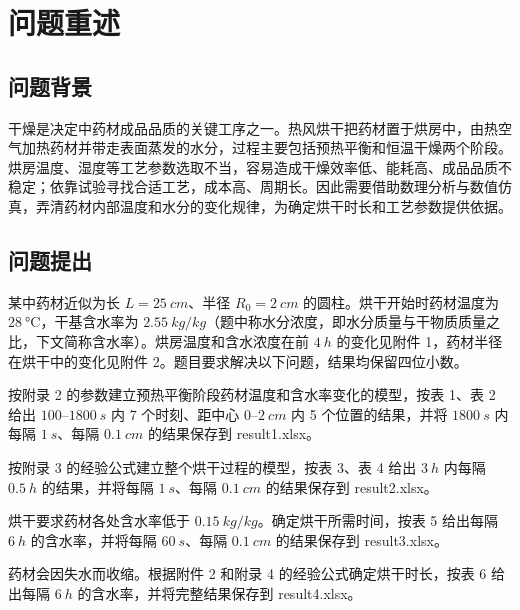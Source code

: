 \section{问题重述}\label{sec:restate}

\subsection{问题背景}

干燥是决定中药材成品品质的关键工序之一。热风烘干把药材置于烘房中，由热空气加热药材并带走表面蒸发的水分，过程主要包括预热平衡和恒温干燥两个阶段。烘房温度、湿度等工艺参数选取不当，容易造成干燥效率低、能耗高、成品品质不稳定；依靠试验寻找合适工艺，成本高、周期长。因此需要借助数理分析与数值仿真，弄清药材内部温度和水分的变化规律，为确定烘干时长和工艺参数提供依据。

\subsection{问题提出}

某中药材近似为长 $L=\SI{25}{cm}$、半径 $R_0=\SI{2}{cm}$ 的圆柱。烘干开始时药材温度为 $\SI{28}{\celsius}$，干基含水率为 $\SI{2.55}{kg/kg}$（题中称水分浓度，即水分质量与干物质质量之比，下文简称含水率）。烘房温度和含水浓度在前 $\SI{4}{h}$ 的变化见附件 1，药材半径在烘干中的变化见附件 2。题目要求解决以下问题，结果均保留四位小数。

\begin{description}[leftmargin=2.4em,itemsep=2pt,font=\heiti]
\item[问题一] 按附录 2 的参数建立预热平衡阶段药材温度和含水率变化的模型，按表 1、表 2 给出 $100$--$\SI{1800}{s}$ 内 7 个时刻、距中心 $0$--$\SI{2}{cm}$ 内 5 个位置的结果，并将 $\SI{1800}{s}$ 内每隔 $\SI{1}{s}$、每隔 $\SI{0.1}{cm}$ 的结果保存到 result1.xlsx。
\item[问题二] 按附录 3 的经验公式建立整个烘干过程的模型，按表 3、表 4 给出 $\SI{3}{h}$ 内每隔 $\SI{0.5}{h}$ 的结果，并将每隔 $\SI{1}{s}$、每隔 $\SI{0.1}{cm}$ 的结果保存到 result2.xlsx。
\item[问题三] 烘干要求药材各处含水率低于 $\SI{0.15}{kg/kg}$。确定烘干所需时间，按表 5 给出每隔 $\SI{6}{h}$ 的含水率，并将每隔 $\SI{60}{s}$、每隔 $\SI{0.1}{cm}$ 的结果保存到 result3.xlsx。
\item[问题四] 药材会因失水而收缩。根据附件 2 和附录 4 的经验公式确定烘干时长，按表 6 给出每隔 $\SI{6}{h}$ 的含水率，并将完整结果保存到 result4.xlsx。
\end{description}
